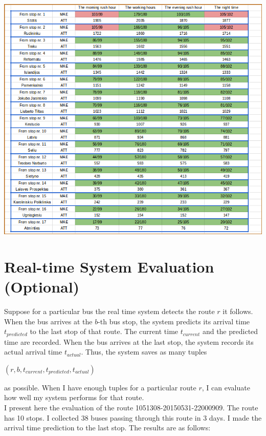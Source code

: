 \documentclass[12pt,a4paper,oneside,openright]{report}
\begin{document}
\includegraphics[width=\textwidth]{figs/table_of_vilnius.png} \\




\newpage
\section{Real-time System Evaluation (Optional)}

Suppose for a particular bus the real time system detects the route $r$ it follows.
When the bus arrives at the $b$-th bus stop, the system predicts its arrival time 
$t_{predicted}$ to the last stop of that route. The current time $t_{current}$
and the predicted time are recorded. When the bus arrives at the last stop,
the system records its actual arrival time $t_{actual}$. Thus, the system saves
as many tuples

\begin{center}
$(r, b, t_{current}, t_{predicted}, t_{actual})$
\end{center}

as possible. When I have enough tuples for a particular route $r$, I can evaluate
how well my system performs for that route. \\

I present here the evaluation of the route 1051308-20150531-22000909. The route has 10
stops. I collected $38$ buses passing through this route in 3 days. I made the arrival
time prediction to the last stop. The results are as follows: \\
\end{document}
